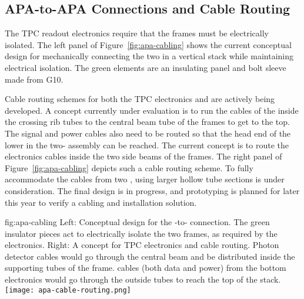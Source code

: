 \subsection{APA-to-APA Connections and Cable Routing}
\label{sec:fdsp-apa-intfc-apa}

The TPC readout electronics require that the  frames must be electrically isolated.  The left panel of Figure~\ref{fig:apa-cabling} shows the current conceptual design for mechanically connecting the two  in a vertical stack while maintaining electrical isolation.  The green elements are an insulating panel and bolt sleeve made from G10. 

Cable routing schemes for both the TPC electronics and  are actively being developed.  A concept currently under evaluation is to run the cables of the  inside the crossing rib tubes to the central beam tube of the  frames to get to the top.  The  signal and power cables also need to be routed so that the head end of the lower  in the two- assembly can be reached. The current concept is to route the electronics cables inside the two side beams of the  frames. The right panel of Figure~\ref{fig:apa-cabling} depicts such a cable routing scheme. To fully accommodate the cables from two , %
using larger hollow tube sections is under consideration. The final design is in progress, and prototyping is planned for later this year to verify a cabling and installation solution.     

\begin{dunefigure}{fig:apa-cabling}
{Left: Conceptual design for the -to- connection.  The green insulator pieces act to electrically isolate the two frames, as required by the  electronics.  Right: A concept for TPC electronics and  cable routing. Photon detector cables would go through the central beam and be distributed inside the supporting tubes of the  frame.   cables (both data and power) from the bottom  electronics would go through the outside tubes to reach the top of the stack.}
\setlength{\fboxsep}{0pt}
\setlength{\fboxrule}{0.5pt}
\qquad \quad
\texttt{[image: apa-cable-routing.png]}
\end{dunefigure}
